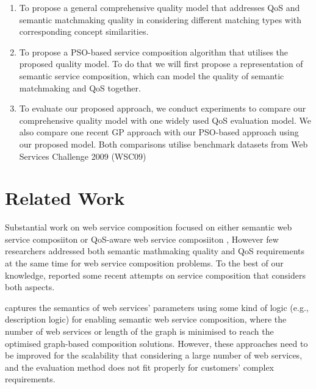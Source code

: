\documentclass{IEEEtran}
\begin{document}
\begin{enumerate}
 \item To propose a general comprehensive quality model that addresses QoS and semantic matchmaking quality in considering different matching types with corresponding concept similarities.
  
 \item To propose a PSO-based service composition algorithm that utilises the proposed quality model. To do that we will first propose a representation of semantic service composition, which can model the quality of semantic matchmaking and QoS together.
  
 \item To evaluate our proposed approach, we conduct experiments to compare our comprehensive quality model with one widely used QoS evaluation model. We also compare one recent GP approach \cite{ma2015hybrid} with our PSO-based approach using our proposed model. Both comparisons utilise benchmark datasets from Web Services Challenge 2009 (WSC09) \cite{kona2009wsc} 
  
\end{enumerate}

\section{Related Work} \label{relatedWork}
Substantial work on web service composition focused on either semantic web service composiiton \cite{boustil2014semantic,mier2015integrated, bansal2016generalized} or QoS-aware web service composiiton \cite{da2016particle,da2015graphevol,yu2013adaptive, gupta2015optimization,qi2010combining,ma2015hybrid}, However few researchers addressed both semantic mathmaking quality and QoS requirements at the same time for web service composition problems. To the best of our knowledge, \cite{lecue2009optimizing,fanjiang2014semantic,pop2009immune} reported some recent attempts on service composition that considers both aspects.

\cite{boustil2014semantic,mier2015integrated, bansal2016generalized} captures the semantics of web services' parameters using some kind of logic (e.g., description logic) for enabling semantic web service composition, where the number of web services or length of the graph is minimised to reach the optimised graph-based composition solutions. However, these approaches need to be improved for the scalability that considering a large number of web services, and the evaluation method does not fit properly for customers' complex requirements.
\end{document}
